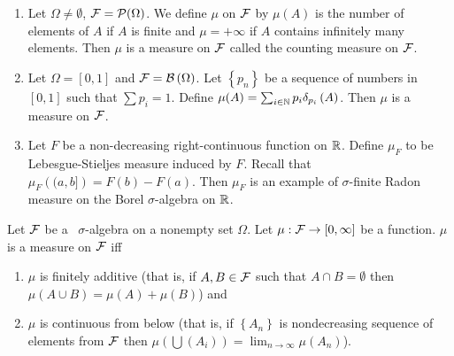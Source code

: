 \begin{example}
    \begin{enumerate}

	\item Let $\Omega \ne \emptyset$, ${\cal F} = {\cal P} (\Omega)$. We define $\mu$ on ${\cal F}$ by $\mu (A)$ is the number of elements of $A$ if $A$ is finite and $\mu = +\infty$ if $A$ contains infinitely many elements. Then $\mu$ is a measure on ${\cal F}$ called the counting measure on ${\cal F}$.

	\item Let $\Omega =[0,1]$ and ${\cal F} = {\cal B} \left( \Omega \right)$. Let $\left\{ p_n \right\}$ be a sequence of numbers in $[0,1]$ such that $\sum p_i =1$. Define $\mu (A) = \sum_{i\in\mathbb N} p_i \delta _{p_i} \left( A \right)$. Then $\mu $ is a measure on ${\cal F}$.

	\item Let $F$ be a non-decreasing right-continuous function on $\mathbb R$. Define $\mu_F$ to be Lebesgue-Stieljes measure induced by $F$. Recall that $\mu_F \left( (a,b] \right) = F(b)-F(a)$. Then $\mu _F$ is an example of $\sigma$-finite Radon measure on the Borel $\sigma$-algebra on $\mathbb R$.

    \end{enumerate}
\end{example}

\begin{theorem}
    Let ${\cal F}$ be a \ $\sigma$-algebra on a nonempty set $\Omega$. Let $\mu : {\cal F} \to  [0, \infty]$ be a function. $\mu$ is a measure on ${\cal F}$ iff 
	\begin{enumerate}
	    \item$\mu$ is finitely additive (that is, if $A,B \in {\cal F}$ such that $A\cap B =\emptyset$ then $\mu (A \cup B) = \mu (A) + \mu (B)$) and 
	    \item $\mu$ is continuous from below (that is, if $\left\{ A_n \right\}$ is nondecreasing sequence of elements from ${\cal F}$ then $\mu\left( \bigcup \left( A_i \right) \right) = \lim_{n\to\infty} \mu \left( A_n \right)$).
	    \end{enumerate}
    \label{thm:equiv-measure}
\end{theorem}

